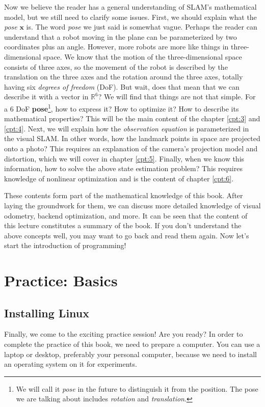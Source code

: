 Now we believe the reader has a general understanding of SLAM's mathematical model, but we still need to clarify some issues. First, we should explain what the \textit{pose} $\mathbf{x}$ is. The word \textit{pose} we just said is somewhat vague. Perhaps the reader can understand that a robot moving in the plane can be parameterized by two coordinates plus an angle. However, more robots are more like things in three-dimensional space. We know that the motion of the three-dimensional space consists of three axes, so the movement of the robot is described by the translation on the three axes and the rotation around the three axes, totally having six \textit{degrees of freedom} (DoF). But wait, does that mean that we can describe it with a vector in $\mathbb{R}^6$? We will find that things are not that simple. For a 6 DoF \textbf{pose}\footnote{We will call it \textit{pose} in the future to distinguish it from the position. The pose we are talking about includes \textit{rotation} and \textit{translation}. }, how to express it? How to optimize it? How to describe its mathematical properties?  This will be the main content of the chapter \ref{cpt:3} and \ref{cpt:4}. Next, we will explain how the \textit{observation equation} is parameterized in the visual SLAM. In other words, how the landmark points in space are projected onto a photo? This requires an explanation of the camera's projection model and distortion, which we will cover in chapter \ref{cpt:5}. Finally, when we know this information, how to solve the above state estimation problem? This requires knowledge of nonlinear optimization and is the content of chapter \ref{cpt:6}.
    
These contents form part of the mathematical knowledge of this book. After laying the groundwork for them, we can discuss more detailed knowledge of visual odometry, backend optimization, and more. It can be seen that the content of this lecture constitutes a summary of the book. If you don't understand the above concepts well, you may want to go back and read them again. Now let's start the introduction of programming!

\section{Practice: Basics}
\subsection{Installing Linux}
Finally, we come to the exciting practice session! Are you ready? In order to complete the practice of this book, we need to prepare a computer. You can use a laptop or desktop, preferably your personal computer, because we need to install an operating system on it for experiments.

